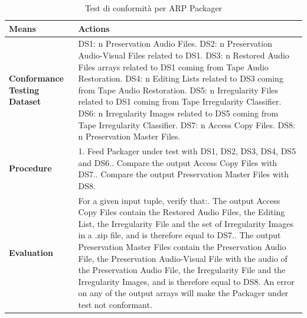 \begin{table}[h]
    \centering
    \begin{tabular}{|p{}|p{}|}
        \hline
        \textbf{Means}   &   \textbf{Actions}\\
        \hline
        \textbf{Conformance Testing Dataset}    &
            DS1: n Preservation Audio Files.\newline
            DS2: n Preservation Audio-Visual Files related to DS1.\newline
            DS3: n Restored Audio Files arrays related to DS1 coming from Tape Audio Restoration.\newline
            DS4: n Editing Lists related to DS3 coming from Tape Audio Restoration.\newline
            DS5: n Irregularity Files related to DS1 coming from Tape Irregularity Classifier.\newline
            DS6: n Irregularity Images related to DS5 coming from Tape Irregularity Classifier.\newline
            DS7: n Access Copy Files.\newline
            DS8: n Preservation Master Files.\\
        \hline
        \textbf{Procedure}  &
            1.	Feed Packager under test with DS1, DS2, DS3, DS4, DS5 and DS6.\newline
            2.	Compare the output Access Copy Files with DS7.\newline
            3.	Compare the output Preservation Master Files with DS8.\\
        \hline
        \textbf{Evaluation} &
            For a given input tuple, verify that:\newline
                1.	The output Access Copy Files contain the Restored Audio Files, the Editing List, the Irregularity File and the set of Irregularity Images in a .zip file, and is therefore equal to DS7.\newline
                2.	The output Preservation Master Files contain the Preservation Audio File, the Preservation Audio-Visual File with the audio of the Preservation Audio File, the Irregularity File and the Irregularity Images, and is therefore equal to DS8.\newline
            An error on any of the output arrays will make the Packager under test not conformant.\\
        \hline
    \end{tabular}
    \caption{Test di conformità per \ac{ARP} Packager}
    \label{tab:packager-valutazione}
\end{table}

